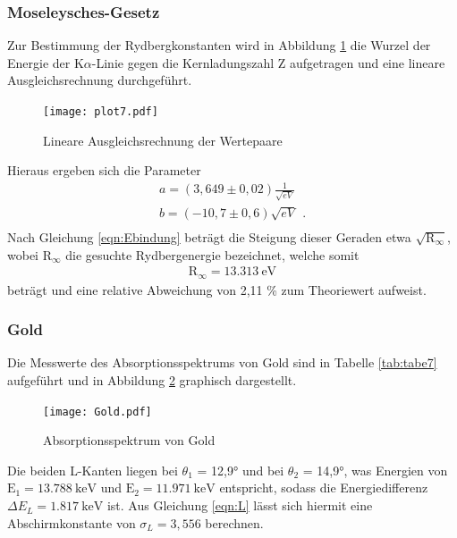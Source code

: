 \subsubsection{Moseleysches-Gesetz}
Zur Bestimmung der Rydbergkonstanten wird in Abbildung \ref{fig:plot7} die Wurzel der Energie
der K$\alpha$-Linie gegen die Kernladungszahl Z aufgetragen und eine lineare Ausgleichsrechnung
durchgeführt.
\begin{figure}[H]
  \centering
  \texttt{[image: plot7.pdf]}
  \caption{Lineare Ausgleichsrechnung der Wertepaare}
  \label{fig:plot7}
\end{figure}
Hieraus ergeben sich die Parameter
\begin{align*}
  a = (3,649 \pm 0,02) \frac{1}{\sqrt{eV}} \\
  b = (-10,7 \pm 0,6) \sqrt{eV} \: \: . \\
\end{align*}
Nach Gleichung \ref{eqn:Ebindung} beträgt die Steigung dieser
Geraden etwa $\sqrt{\text{R}_{\infty}}$,
wobei $\text{R}_{\infty}$ die gesuchte Rydbergenergie
bezeichnet, welche somit
\begin{align*}
  \text{R}_{\infty}= \SI{13.313}{\electronvolt}
\end{align*}
beträgt und eine relative Abweichung von 2,11 \% zum Theoriewert aufweist.
\subsubsection{Gold}
Die Messwerte des Absorptionsspektrums von Gold sind in Tabelle \ref{tab:tabe7} aufgeführt und
in Abbildung \ref{fig:Gold} graphisch dargestellt.
\begin{figure}[H]
  \centering
  \texttt{[image: Gold.pdf]}
  \caption{Absorptionsspektrum von Gold}
  \label{fig:Gold}
\end{figure}
Die beiden L-Kanten liegen bei $\theta_1$ = 12,9° und bei $\theta_2$ = 14,9°, was Energien
von $\text{E}_{1} = \SI{13.788}{\kilo\electronvolt}$ und
$\text{E}_{2} = \SI{11.971}{\kilo\electronvolt}$ entspricht, sodass die Energiedifferenz
$\Delta E_L = \SI{1.817}{\kilo\electronvolt}$ ist.
Aus Gleichung \ref{eqn:L} lässt sich hiermit eine Abschirmkonstante von
$\sigma_L = 3,556$ berechnen.
